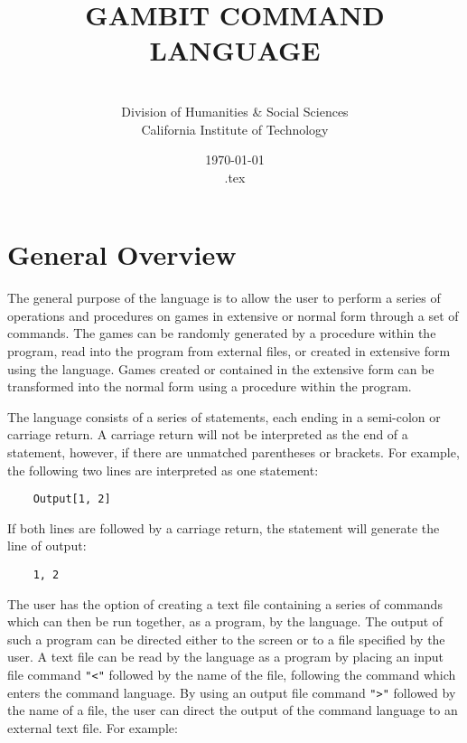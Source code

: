 \renewcommand{\baselinestretch}{.9}
\newcommand{\bd}{\begin{description}}
\newcommand{\ed}{\end{description}}


\title{GAMBIT COMMAND LANGUAGE}

\author{\ \ \\
Division of Humanities \& Social Sciences\\
California Institute of Technology}

\date{\today\\ \time \jobname.tex}

\maketitle

\section*{General Overview}

The general purpose of the language is to allow the user to perform a series of
operations and procedures on games in extensive or normal form through a set of
commands.  The games can be randomly generated by a procedure within the
program, read into the program from external files, or created in extensive
form using the language.  Games created or contained in the extensive form can
be transformed into the normal form using a procedure within the program.

The language consists of a series of statements, each ending in a semi-colon
or carriage return.  A carriage return will not be interpreted as the end of a
statement, however, if there are unmatched parentheses or brackets.  For
example, the following two lines are interpreted as one statement:

\begin{verbatim}
	Output[1, 2]
\end{verbatim}

If both lines are followed by a carriage return, the statement will generate
the line of output: 

\begin{verbatim}
	1, 2
\end{verbatim}

The user has the option of creating a text file containing a series of commands
which can then be run together, as a program, by the language.  The output of 
such a program can be directed either to the screen or to a file specified by 
the user.  A text file can be read by the language as a program by placing an 
input file command {\tt "<"} followed by the name of the file, following the 
command which enters the command language.  By using an output file command 
{\tt ">"} followed by the name of a file, the user can direct the output of 
the command language to an external text file.  For example:

